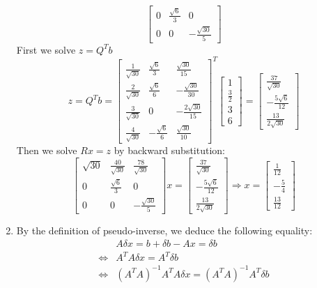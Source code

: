 \documentclass[english,onecolumn]{IEEEtran}
\begin{document}
\begin{enumerate}
$$\begin{bmatrix}
    0 &  \frac{\sqrt{6}}{3} & 0\\
    0 &  0 & -\frac{\sqrt{30}}{5}
    \end{bmatrix}$$
    First we solve $z= Q^Tb$
    $$z = Q^Tb=\begin{bmatrix}
    \frac{1}{\sqrt{30}} &  \frac{\sqrt{6}}{3} & \frac{\sqrt{30}}{15}\\
    \frac{2}{\sqrt{30}} &  \frac{\sqrt{6}}{6} & -\frac{\sqrt{30}}{30}\\
    \frac{3}{\sqrt{30}} &  0 & -\frac{2\sqrt{30}}{15}\\
    \frac{4}{\sqrt{30}} &  -\frac{\sqrt{6}}{6} & \frac{\sqrt{30}}{10} 
    \end{bmatrix}^T\begin{bmatrix}  1 \\ \frac{3}{2} \\ 3  \\ 6\end{bmatrix}=\begin{bmatrix}  \frac{37}{\sqrt{30}} \\ -\frac{5\sqrt{6}}{12} \\ \frac{13}{2\sqrt{30}}\end{bmatrix}$$
    Then we solve $Rx = z$ by backward substitution:
    $$\begin{bmatrix}
    \sqrt{30} &  \frac{40}{\sqrt{30}} & \frac{78}{\sqrt{30}}\\
    0 &  \frac{\sqrt{6}}{3} & 0\\
    0 &  0 & -\frac{\sqrt{30}}{5}
    \end{bmatrix}x = \begin{bmatrix}  \frac{37}{\sqrt{30}} \\ -\frac{5\sqrt{6}}{12} \\ \frac{13}{2\sqrt{30}}\end{bmatrix} \Rightarrow x = \begin{bmatrix}  \frac{1}{12} \\ -\frac{5}{4} \\ \frac{13}{12}\end{bmatrix}$$
    \item By the definition of pseudo-inverse, we deduce the following equality:
    \begin{align*}
    	&A\delta x = b+\delta b -Ax = \delta b\\
    	\Leftrightarrow & A^TA\delta x = A^T\delta b\\
    	\Leftrightarrow & (A^TA)^{-1}A^TA\delta x = (A^TA)^{-1}A^T\delta b\\

\end{align*}
\end{enumerate}
\end{document}
